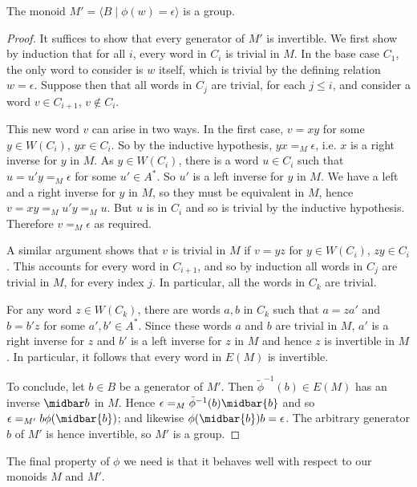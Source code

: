 \documentclass[noindex,noinsetproof,emphthm,12pt]{lmaths}
\begin{document}
\begin{prop} \label{prop:M'-is-group}
	The monoid $M' = \langle B \mid \phi(w) = \epsilon\rangle$ is a group.
\end{prop}
\begin{proof}
	It suffices to show that every generator of $M'$ is invertible. We first show by induction that for all $i$, every word in $C_i$ is trivial in $M$. In the base case $C_1$, the only word to consider is $w$ itself, which is trivial by the defining relation $w = \epsilon$. Suppose then that all words in $C_j$ are trivial, for each $j \le i$, and consider a word $v \in C_{i+1}$, $v \not\in C_i$.

	This new word $v$ can arise in two ways. In the first case, $v = xy$ for some $y \in W(C_i)$, $yx \in C_i$. So by the inductive hypothesis, $yx =_M \epsilon$, i.e. $x$ is a right inverse for $y$ in $M$. As $y \in W(C_i)$, there is a word $u \in C_i$ such that $u = u'y =_M \epsilon$ for some $u' \in A^*$. So $u'$ is a left inverse for $y$ in $M$. We have a left and a right inverse for $y$ in $M$, so they must be equivalent in $M$, hence $v = xy =_M u'y =_M u$. But $u$ is in $C_i$ and so is trivial by the inductive hypothesis. Therefore $v =_M \epsilon$ as required.

	A similar argument shows that $v$ is trivial in $M$ if $v = yz$ for $y \in W(C_i)$, $zy \in C_i$. This accounts for every word in $C_{i+1}$, and so by induction all words in $C_j$ are trivial in $M$, for every index $j$. In particular, all the words in $C_k$ are trivial.

	For any word $z \in W(C_k)$, there are words $a, b$ in $C_k$ such that $a = za'$ and $b = b'z$ for some $a', b' \in A^*$. Since these words $a$ and $b$ are trivial in $M$, $a'$ is a right inverse for $z$ and $b'$ is a left inverse for $z$ in $M$ and hence $z$ is invertible in $M$. In particular, it follows that every word in $E(M)$ is invertible.

	To conclude, let $b \in B$ be a generator of $M'$. Then $\tilde\phi^{-1}(b) \in E(M)$ has an inverse $\midbar b$ in $M$. Hence $\epsilon =_M \tilde\phi^{-1}(b) \midbar{b}$ and so $\epsilon =_{M'} b\phi(\midbar{b})$; and likewise $\phi(\midbar{b})b = \epsilon$. The arbitrary generator $b$ of $M'$ is hence invertible, so $M'$ is a group.
\end{proof}

The final property of $\phi$ we need is that it behaves well with respect to our monoids $M$ and $M'$.
\end{document}
